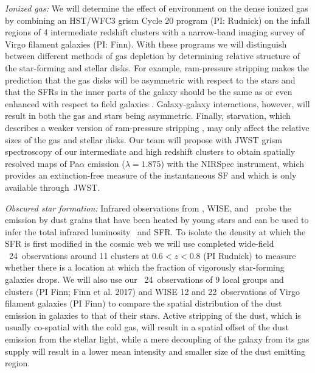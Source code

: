 \documentclass[11pt]{article}
\begin{document}
\textit{Ionized gas:} We will determine the effect of environment on the dense ionized
gas by combining an HST/WFC3 grism Cycle 20 program
(PI: Rudnick) on the infall regions of 4 intermediate redshift
clusters with a narrow-band imaging survey of Virgo filament galaxies (PI: Finn).  With these programs
we will distinguish between different methods of gas depletion by
determining relative structure of the star-forming and stellar disks.
For example, ram-pressure stripping makes the prediction that the gas
disks will be asymmetric \citep[e.g.][]{Quilis00,Crowl05} with respect
to the stars and that the SFRs in the inner parts of the galaxy should
be the same as or even enhanced with respect to field galaxies
\citep{Koopmann04,Weinmann10}.  Galaxy-galaxy interactions, however,
will result in both the gas and stars being asymmetric.  Finally,
starvation, which describes a weaker version of ram-pressure stripping
\citep[e.g.][]{Larson80}, may only affect the relative sizes of the
gas and stellar disks.  Our team will propose with JWST grism spectroscopy of our intermediate and high redshift clusters to obtain spatially resolved maps of Pa$\alpha$ emission ($\lambda=1.875$\micron) with the  NIRSpec instrument, which provides an extinction-free measure of the instantaneous SF and which is only available through~JWST.


\textit{Obscured star formation:} Infrared observations from
\spitzer, WISE, and \herschel\ probe the emission by dust grains that have
been heated by young stars and can be used to infer the total
infrared luminosity \lir\ and SFR.  
To isolate the density at which the SFR is first modified in the cosmic web we will use completed wide-field
\spitzer\ 24\micron\ observations around 11 clusters at $0.6<z<0.8$
(PI Rudnick) to measure whether there is a location at which the
fraction of vigorously star-forming galaxies drops.  We will also use our
\spitzer\ 24\micron\ observations of 9 local groups and clusters (PI Finn; Finn et al. 2017) and WISE 12 and 22\micron\ observations of Virgo filament galaxies (PI Finn) to
compare the spatial distribution of the dust emission in galaxies to
that of their stars.  Active stripping of the dust, which is usually co-spatial with the cold gas, will
result in a spatial offset of the dust emission from the stellar
light, while a mere decoupling of the galaxy from its gas supply will
result in a lower mean intensity and smaller  size of the dust emitting region.
\end{document}
